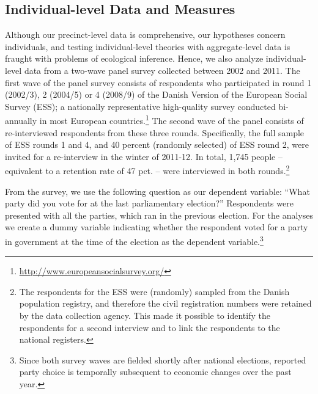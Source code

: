 \documentclass[12pt,a4paper]{article}
\begin{document}
	\subsection{Individual-level Data and Measures}\label{individuallevel}
	Although our precinct-level data is comprehensive, our hypotheses concern individuals, and testing individual-level theories with aggregate-level data is fraught with problems of ecological inference. Hence, we also analyze individual-level data from a two-wave panel survey collected between 2002 and 2011. The first wave of the panel survey consists of respondents who participated in round 1 (2002/3), 2 (2004/5) or 4 (2008/9) of the Danish Version of the European Social Survey (ESS); a nationally representative high-quality survey conducted bi-annually in most European countries.\footnote{\href{http://www.europeansocialsurvey.org/}{http://www.europeansocialsurvey.org/}} The second wave of the panel consists of re-interviewed respondents from these three rounds. Specifically, the full sample of ESS rounds 1 and 4, and 40 percent (randomly selected) of ESS round 2, were invited for a re-interview in the winter of 2011-12. In total, 1,745 people – equivalent to a retention rate of 47 pct. – were interviewed in both rounds.\footnote{The respondents for the ESS were (randomly) sampled from the Danish population registry, and therefore the civil registration numbers were retained by the data collection agency. This made it possible to identify the respondents for a second interview and to link the respondents to the national registers.} 
	
	From the survey, we use the following question as our dependent variable: ``What party did you vote for at the last parliamentary election?'' Respondents were presented with all the parties, which ran in the previous election. For the analyses we create a dummy variable indicating whether the respondent voted for a party in government at the time of the election as the dependent variable.\footnote{Since both survey waves are fielded shortly after national elections, reported party choice is temporally subsequent to economic changes over the past year.}
	
\end{document}

